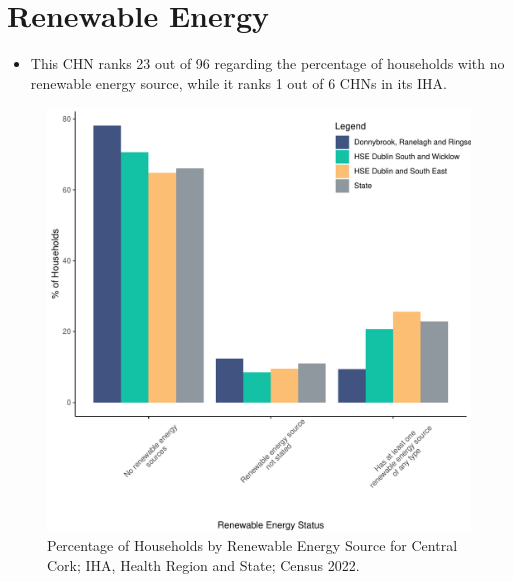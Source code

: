 \documentclass{article}
\begin{document}
\section{Renewable Energy}\label{sect:RE}
\begin{itemize}
\item This CHN ranks  23 out of 96 regarding the percentage of households with no renewable energy source, while it ranks   1 out of 6 CHNs in its IHA.
\end{itemize}
\begin{figure}[H]
	\centering
	\includegraphics[width = 140mm]{../figures/RenewableEnergyED.pdf}
	\caption{Percentage of Households by Renewable Energy Source for Central Cork; IHA, Health Region and State; Census 2022.}
	\label{fig:vbnv}
	\end{figure}
\end{document}
